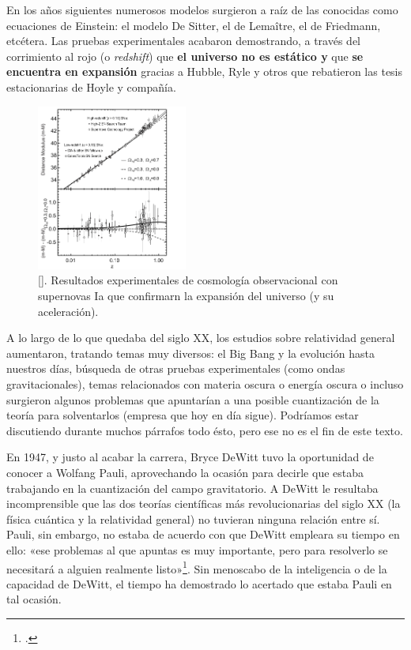 \documentclass[11pt,a4paper,titlepage]{article}
\begin{document}
En los años siguientes numerosos modelos surgieron a raíz de las conocidas como ecuaciones de Einstein: el modelo De Sitter, el de Lemaître, el de Friedmann, etcétera. Las pruebas experimentales acabaron demostrando, a través del corrimiento al rojo (o \textit{redshift}) que \textbf{el universo no es estático y} que \textbf{se encuentra en expansión} gracias a Hubble, Ryle y otros que rebatieron las tesis estacionarias de Hoyle y compañía.

\begin{figure}
	\centering
	\includegraphics[width=0.44\textwidth]{hubble2}
	\caption{[\cite[p.~17]{perlmutterschmidt}]. Resultados experimentales de cosmología observacional con supernovas Ia que confirmarn la expansión del universo (y su aceleración).}
	\label{fig:einstein2}
\end{figure}

A lo largo de lo que quedaba del siglo XX, los estudios sobre relatividad general aumentaron, tratando temas muy diversos: el Big Bang y la evolución hasta nuestros días, búsqueda de otras pruebas experimentales (como ondas gravitacionales), temas relacionados con materia oscura o energía oscura o incluso surgieron algunos problemas que apuntarían a una posible cuantización de la teoría para solventarlos (empresa que hoy en día sigue). Podríamos estar discutiendo durante muchos párrafos todo ésto, pero ese no es el fin de este texto.

En 1947, y justo al acabar la carrera, Bryce DeWitt tuvo la oportunidad de conocer a Wolfang Pauli, aprovechando la ocasión para decirle que estaba trabajando en la cuantización del campo gravitatorio. A DeWitt le resultaba incomprensible que las dos teorías científicas más revolucionarias del siglo XX (la física cuántica y la relatividad general) no tuvieran ninguna relación entre sí. Pauli, sin embargo, no estaba de acuerdo con que DeWitt empleara su tiempo en ello: «ese problemas al que apuntas es muy importante, pero para resolverlo se necesitará a alguien realmente listo»\footnote{\cite[p.~230]{teoriaperfecta}.}. Sin menoscabo de la inteligencia o de la capacidad de DeWitt, el tiempo ha demostrado lo acertado que estaba Pauli en tal ocasión.
\end{document}
